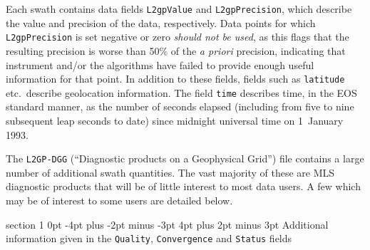 \documentclass[11pt,draft]{report}
\makeatletter
\renewcommand{\section}{\@startsection%
  {section}%
  {1}%
  {0pt}%
  {-4pt plus -2pt minus -3pt}%
  {4pt plus 2pt minus 3pt}%
  {\Large\sffamily\fontseries{sb}\selectfont\flushleft\color{SectionColor}\figureversion{tabular}}}%
\providecommand{\DIFaddtex}[1]{{\protect\color{blue}\uwave{#1}}} %
\providecommand{\DIFaddbegin}{} %
\providecommand{\DIFaddend}{} %
\providecommand{\DIFadd}[1]{\texorpdfstring{\DIFaddtex{#1}}{#1}} %
\makeatother
\begin{document}
Each swath contains data fields \texttt{L2gpValue} and
\texttt{L2gpPrecision}, which describe the value and precision \DIFaddbegin \DIFadd{(reported
at 1$\sigma$) }\DIFaddend of the data, respectively.  Data points for which
\texttt{L2gpPrecision} is set negative or zero \emph{should not be
  used}, as this flags that the resulting precision is worse than 50\%
of the \emph{a priori} precision, indicating that instrument and/or the
algorithms have failed to provide enough useful information for that
point.  In addition to these fields, fields such as \texttt{latitude}
etc.\ describe geolocation information.  The field \texttt{time}
describes time, in the EOS standard manner, as the number of seconds
elapsed (including from five to nine subsequent leap seconds to date)
since midnight universal time on 1~January 1993.

The \texttt{L2GP-DGG} (``Diagnostic products on a Geophysical Grid'')
file contains a large number of additional swath quantities.  The vast
majority of these are MLS diagnostic products that will be of little
interest to most data users.  A few which may be of interest to some
users are detailed below.

\section{Additional information given in the \texttt{Quality},
  \texttt{Convergence} and \texttt{Status} fields}
\label{sec:StatusQuality}
\end{document}
